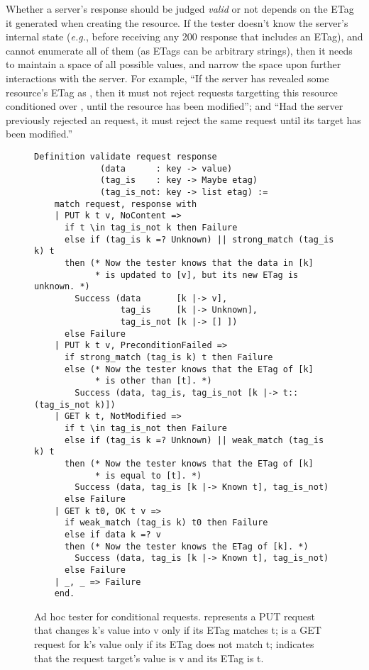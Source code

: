 Whether a server's response should be judged {\em valid} or not depends on the
ETag it generated when creating the resource.  If the tester doesn't know the
server's internal state ({\it e.g.}, before receiving any 200 response that
includes an ETag), and cannot enumerate all of them (as ETags can be arbitrary
strings), then it needs to maintain a space of all possible values, and narrow
the space upon further interactions with the server.  For example, ``If the
server has revealed some resource's ETag as , then it must
not reject requests targetting this resource conditioned over , until the resource has been modified''; and ``Had the server
previously rejected an  request, it must reject the same
request until its target has been modified.''

\begin{figure}
\begin{lstlisting}[style=customcoq]
  Definition validate request response
             (data      : key -> value)
             (tag_is    : key -> Maybe etag)
             (tag_is_not: key -> list etag) :=
    match request, response with
    | PUT k t v, NoContent => 
      if t \in tag_is_not k then Failure
      else if (tag_is k =? Unknown) || strong_match (tag_is k) t
      then (* Now the tester knows that the data in [k]
            * is updated to [v], but its new ETag is unknown. *)
        Success (data       [k |-> v],
                 tag_is     [k |-> Unknown],
                 tag_is_not [k |-> [] ])
      else Failure
    | PUT k t v, PreconditionFailed =>
      if strong_match (tag_is k) t then Failure
      else (* Now the tester knows that the ETag of [k]
            * is other than [t]. *)
        Success (data, tag_is, tag_is_not [k |-> t::(tag_is_not k)])
    | GET k t, NotModified =>
      if t \in tag_is_not then Failure
      else if (tag_is k =? Unknown) || weak_match (tag_is k) t
      then (* Now the tester knows that the ETag of [k]
            * is equal to [t]. *)
        Success (data, tag_is [k |-> Known t], tag_is_not)
      else Failure
    | GET k t0, OK t v =>
      if weak_match (tag_is k) t0 then Failure
      else if data k =? v
      then (* Now the tester knows the ETag of [k]. *)
        Success (data, tag_is [k |-> Known t], tag_is_not)
      else Failure
    | _, _ => Failure
    end.
\end{lstlisting}
  \caption[Ad hoc tester for \http conditional requests.]{Ad hoc tester for
    \http conditional requests.   represents a PUT request that
    changes \ilc k's value into \ilc v only if its ETag matches \ilc t;  is a GET request for \ilc k's value only if its ETag does not match
    \ilc t;  indicates that the request target's value is \ilc v and
    its ETag is \ilc t.}
  \label{fig:etag-tester}
\end{figure}


